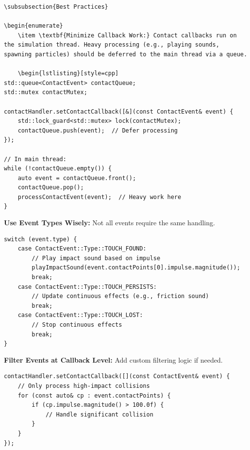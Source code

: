 \begin{lstlisting}[style=cpp]
\subsubsection{Best Practices}

\begin{enumerate}
    \item \textbf{Minimize Callback Work:} Contact callbacks run on the simulation thread. Heavy processing (e.g., playing sounds, spawning particles) should be deferred to the main thread via a queue.

    \begin{lstlisting}[style=cpp]
std::queue<ContactEvent> contactQueue;
std::mutex contactMutex;

contactHandler.setContactCallback([&](const ContactEvent& event) {
    std::lock_guard<std::mutex> lock(contactMutex);
    contactQueue.push(event);  // Defer processing
});

// In main thread:
while (!contactQueue.empty()) {
    auto event = contactQueue.front();
    contactQueue.pop();
    processContactEvent(event);  // Heavy work here
}
    \end{lstlisting}

    \item \textbf{Use Event Types Wisely:} Not all events require the same handling.

    \begin{lstlisting}[style=cpp]
switch (event.type) {
    case ContactEvent::Type::TOUCH_FOUND:
        // Play impact sound based on impulse
        playImpactSound(event.contactPoints[0].impulse.magnitude());
        break;
    case ContactEvent::Type::TOUCH_PERSISTS:
        // Update continuous effects (e.g., friction sound)
        break;
    case ContactEvent::Type::TOUCH_LOST:
        // Stop continuous effects
        break;
}
    \end{lstlisting}

    \item \textbf{Filter Events at Callback Level:} Add custom filtering logic if needed.

    \begin{lstlisting}[style=cpp]
contactHandler.setContactCallback([](const ContactEvent& event) {
    // Only process high-impact collisions
    for (const auto& cp : event.contactPoints) {
        if (cp.impulse.magnitude() > 100.0f) {
            // Handle significant collision
        }
    }
});
    \end{lstlisting}

